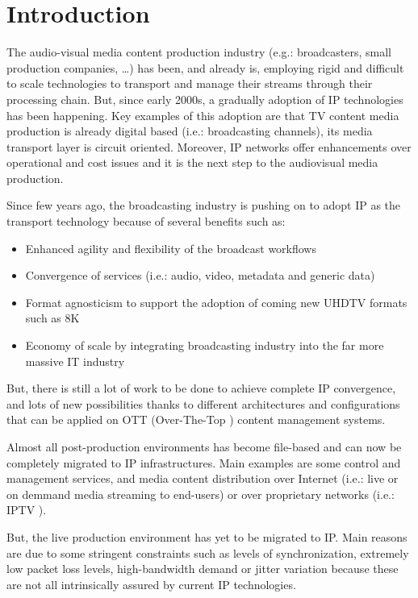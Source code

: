 \cleardoublepage
{}
\chapter*{Introduction}
 
The audio-visual media content production industry (e.g.: broadcasters, small production companies, \ldots) has been, and already is, employing rigid and difficult to scale technologies to transport and manage their streams through their processing chain. But, since early 2000s, a gradually adoption of IP technologies has been happening. Key examples of this adoption are that TV content media production is already digital based (i.e.: broadcasting channels), its media transport layer is circuit oriented. Moreover, IP networks offer enhancements over operational and cost issues and it is the next step to the audiovisual media production.

Since few years ago, the broadcasting industry is pushing on to adopt IP as the transport technology because of several benefits such as:

\begin{itemize}
  \item Enhanced agility and flexibility of the broadcast workflows
  \item Convergence of services (i.e.: audio, video, metadata and generic data)
  \item Format agnosticism to support the adoption of coming new UHDTV formats such as 8K 
  \item Economy of scale by integrating broadcasting industry into the far more massive IT industry
\end{itemize}

But, there is still a lot of work to be done to achieve complete IP convergence, and lots of new possibilities thanks to different architectures and configurations that can be applied on OTT (Over-The-Top \cite{ottVSiptv}) content management systems. 

Almost all post-production environments has become file-based and can now be completely migrated to IP infrastructures. Main examples are some control and management services, and media content distribution over Internet (i.e.: live or on demmand media streaming to end-users) or over proprietary networks (i.e.: IPTV \cite{ottVSiptv}).

But, the live production environment has yet to be migrated to IP. Main reasons are due to some stringent constraints such as levels of synchronization, extremely low packet loss levels, high-bandwidth demand or jitter variation because these are not all intrinsically assured by current IP technologies.

